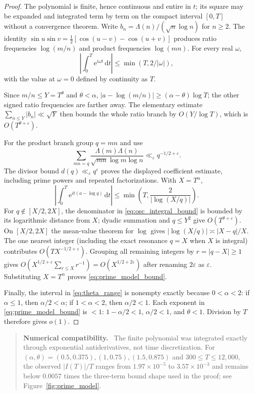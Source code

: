 \documentclass[11pt]{amsart}
\theoremstyle{definition}
\theoremstyle{remark}
\newcommand{\dd}{\,\mathrm d}
\newcommand{\ee}{\mathrm e}
\newenvironment{numericalcheck}
{\begin{quote}\small\noindent\textbf{Numerical compatibility.}\ }{\end{quote}}
\begin{document}
\begin{proof}
The polynomial is finite, hence continuous and entire in $t$; its square may
be expanded and integrated term by term on the compact interval $[0,T]$
without a convergence theorem.  Write
$b_n=\Lambda(n)/(\sqrt n\log n)$ for $n\ge2$.  The identity
$\sin u\sin v=\tfrac12[\cos(u-v)-\cos(u+v)]$ produces ratio frequencies
$\log(m/n)$ and product frequencies $\log(mn)$.  For every real $\omega$,
\begin{equation}\label{eq:osc_integral_bound}
\left|\int_0^T\ee^{i\omega t}\dd t\right|
\le\min(T,2/|\omega|),
\end{equation}
with the value at $\omega=0$ defined by continuity as $T$.

Since $m/n\leq Y=T^\theta$ and $\theta<\alpha$,
$|a-\log(m/n)|\ge(\alpha-\theta)\log T$; the other signed ratio frequencies
are farther away.  The elementary estimate
$\sum_{n\le Y}|b_n|\ll\sqrt Y$ then bounds the whole ratio branch by
$O(Y/\log T)$, which is $O(T^{\theta+\varepsilon})$.

For the product branch group $q=mn$ and use
\[
\sum_{mn=q}
\frac{\Lambda(m)\Lambda(n)}{\sqrt{mn}\log m\log n}
\ll_\varepsilon q^{-1/2+\varepsilon}.
\]
The divisor bound $d(q)\ll_\varepsilon q^\varepsilon$ proves the displayed
coefficient estimate, including prime powers and repeated factorizations.
With $X=T^\alpha$,
\[
\left|\int_0^T\ee^{it(a-\log q)}\dd t\right|
\leq\min\!\left(T,\frac2{|\log(X/q)|}\right).
\]
For $q\notin[X/2,2X]$, the denominator in
\eqref{eq:osc_integral_bound} is bounded by its logarithmic distance from
$X$; dyadic summation and $q\le Y^2$ give
$O(T^{\theta+\varepsilon})$.  On $[X/2,2X]$ the mean-value theorem for
$\log$ gives $|\log(X/q)|\asymp|X-q|/X$.  The one nearest integer (including
the exact resonance $q=X$ when $X$ is integral) contributes
$O(TX^{-1/2+\varepsilon})$.  Grouping all remaining integers by
$r=|q-X|\ge1$ gives
$O(X^{1/2+\varepsilon}\sum_{r\le X}r^{-1})
=O(X^{1/2+2\varepsilon})$ after renaming $2\varepsilon$ as $\varepsilon$.
Substituting $X=T^\alpha$ proves \eqref{eq:prime_model_bound}.

Finally, the interval in \eqref{eq:theta_range} is nonempty exactly because
$0<\alpha<2$: if $\alpha\le1$, then $\alpha/2<\alpha$; if
$1<\alpha<2$, then $\alpha/2<1$.  Each exponent in
\eqref{eq:prime_model_bound} is $<1$:
$1-\alpha/2<1$, $\alpha/2<1$, and $\theta<1$.  Division by $T$ therefore
gives $o(1)$.
\end{proof}

\begin{numericalcheck}
The finite polynomial was integrated exactly through exponential
antiderivatives, not time discretization.  For
$(\alpha,\theta)=(0.5,0.375),(1,0.75),(1.5,0.875)$ and
$300\le T\le12{,}000$, the observed $|I(T)|/T$ ranges from
$1.97\times10^{-5}$ to $3.57\times10^{-3}$ and remains below $0.0057$ times
the three-term bound shape used in the proof; see
Figure~\ref{fig:prime_model}.
\end{numericalcheck}
\end{document}
